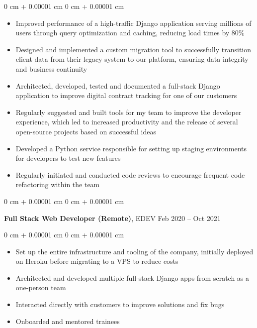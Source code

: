 \documentclass[10pt, letterpaper]{article}
\newenvironment{highlights}{
    \begin{itemize}[
        topsep=0.10 cm,
        parsep=0.10 cm,
        partopsep=0pt,
        itemsep=0pt,
        leftmargin=0 cm + 10pt
    ]
}{
    \end{itemize}
} %
\newenvironment{onecolentry}{
    \begin{adjustwidth}{
        0 cm + 0.00001 cm
    }{
        0 cm + 0.00001 cm
    }
}{
    \end{adjustwidth}
} %
\newenvironment{twocolentry}[2][]{
    \onecolentry
    \def\secondColumn{#2}
    \setcolumnwidth{\fill, 4.5 cm}
    \begin{paracol}{2}
}{
    \switchcolumn \raggedleft \secondColumn
    \end{paracol}
    \endonecolentry
} %
\begin{document}
        \vspace{0.10 cm}
        \begin{onecolentry}
            \begin{highlights}
                \item Improved performance of a high-traffic Django application serving millions of users through query optimization and caching, reducing load times by 80\%
                \item Designed and implemented a custom migration tool to successfully transition client data from their legacy system to our platform, ensuring data integrity and business continuity
                \item Architected, developed, tested and documented a full-stack Django application to improve digital contract tracking for one of our customers
                \item Regularly suggested and built tools for my team to improve the developer experience, which led to increased productivity and the release of several open-source projects based on successful ideas
                \item Developed a Python service responsible for setting up staging environments for developers to test new features
                \item Regularly initiated and conducted code reviews to encourage frequent code refactoring within the team
            \end{highlights}
        \end{onecolentry}


        \vspace{0.2 cm}

        \begin{twocolentry}{
            Feb 2020 – Oct 2021
        }
            \textbf{Full Stack Web Developer (Remote)}, EDEV\end{twocolentry}

        \vspace{0.10 cm}
        \begin{onecolentry}
            \begin{highlights}
                \item Set up the entire infrastructure and tooling of the company, initially deployed on Heroku before migrating to a VPS to reduce costs
                \item Architected and developed multiple full-stack Django apps from scratch as a one-person team
                \item Interacted directly with customers to improve solutions and fix bugs
                \item Onboarded and mentored trainees
            \end{highlights}
        \end{onecolentry}
\end{document}

